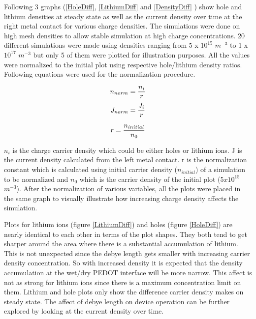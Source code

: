 \begin{doublespace}
 Following 3 graphs (\ref{HoleDiff}, \ref{LithiumDiff} and \ref{DensityDiff} ) show hole and lithium densities at steady state as well as the current density over time at the right metal contact for various charge densities. The simulations were done on high mesh densities to allow stable simulation at high charge concentrations. 20 different simulations were made using densities ranging from $5$ x $10^{15}$  $m^{-3}$ to 1 x $10^{17}$  $m^{-3}$ but only 5 of them were plotted for illustration purposes. All the values were normalized to the initial plot using respective hole/lithium density ratios. Following equations were used for the normalization procedure.


\begin{equation}
\centering
n_{norm}= \frac{n_i}{r} 
\end{equation}
\begin{equation}
\centering
J_{norm}= \frac{J_i}{r} 
\end{equation}

\begin{equation}
\centering
r = \frac{n_{initial}}{n_{0}}
\label{NormConst}
\end{equation}

$n_{i}$ is the charge carrier density which could be either holes or lithium ions. J is the current density calculated from the left metal contact. r is the normalization constant which is calculated using initial carrier density ($n_{initial}$) of a simulation to be normalized and $n_{0}$ which is the carrier density of the initial plot ($5x10^{15}$ $m^{-3}$). After the normalization of various variables, all the plots were placed in the same graph to visually illustrate how increasing charge density affects the simulation. 

Plots for lithium ions (figure \ref{LithiumDiff}) and holes (figure \ref{HoleDiff}) are nearly identical to each other in terms of the plot shapes. They both tend to get sharper around the area where there is a substantial accumulation of lithium. This is not unexpected since the debye length gets smaller with increasing carrier density concentration. So with increased density it is expected that the density accumulation at the wet/dry PEDOT interface will be more narrow. This affect is not as strong for lithium ions since there is a maximum concentration limit on them. Lithium and hole plots only show the difference carrier density makes on steady state. The affect of debye length on device operation can be further explored by looking at the current density over time.   


\end{doublespace}
